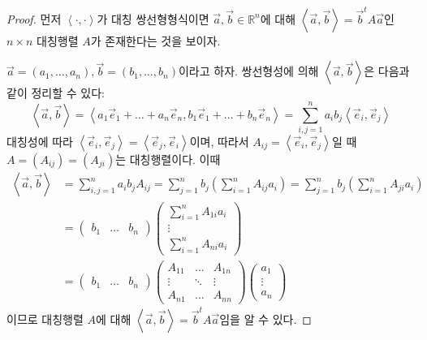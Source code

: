 \documentclass[../engineering_mathematics_lecture_note.tex]{subfiles}
\begin{document}
\begin{proof}
    먼저 $\left<\cdot, \cdot\right>$가 대칭 쌍선형형식이면 $\vec a, \vec b \in \mathbb R^n$에 대해 $\left<\vec a, \vec b\right> = \vec b^t A \vec a$인 $n \times n$ 대칭행렬 $A$가 존재한다는 것을 보이자.

    $\vec a = (a_1, \dots, a_n), \vec b = (b_1, \dots, b_n)$이라고 하자.
    쌍선형성에 의해 $\left<\vec a, \vec b\right>$은 다음과 같이 정리할 수 있다:
    \begin{equation*}
        \left<\vec a, \vec b\right> = \left<a_1 \vec e_1 + \dots + a_n \vec e_n, b_1 \vec e_1 + \dots + b_n \vec e_n\right> = \sum_{i, j = 1}^n a_i b_j \left<\vec e_i, \vec e_j\right>
    \end{equation*}
    대칭성에 따라 $\left<\vec e_i, \vec e_j\right> = \left<\vec e_j, \vec e_i\right>$이며, 따라서 $A_{ij} = \left<\vec e_i, \vec e_j\right>$일 때 $A = (A_{ij}) = (A_{ji})$는 대칭행렬이다.
    이때
    \begin{align*}
        \left<\vec a, \vec b \right> &= \sum_{i, j = 1}^n a_i b_j A_{ij} = \sum_{j = 1}^n b_j \left(\sum_{i = 1}^n A_{ij} a_i\right) = \sum_{j = 1}^n b_j \left(\sum_{i = 1}^n A_{ji} a_i\right)\\
                                     &=
                                     \begin{pmatrix}
                                         b_1 & \dots & b_n
                                     \end{pmatrix}
                                     \begin{pmatrix}
                                         \sum_{i = 1}^n A_{1i} a_i\\
                                         \vdots\\
                                         \sum_{i = 1}^n A_{ni} a_i
                                     \end{pmatrix}\\
                                     &=
                                     \begin{pmatrix}
                                         b_1 & \dots & b_n
                                     \end{pmatrix}
                                     \begin{pmatrix}
                                         A_{11} & \dots & A_{1n}\\
                                         \vdots & \ddots & \vdots\\
                                         A_{n1} & \dots & A_{nn}
                                     \end{pmatrix}
                                     \begin{pmatrix}
                                         a_1\\
                                         \vdots\\
                                         a_n
                                     \end{pmatrix}
    \end{align*}
    이므로 대칭행렬 $A$에 대해 $\left<\vec a, \vec b\right> = \vec b^t A \vec a$임을 알 수 있다.


\end{proof}
\end{document}
